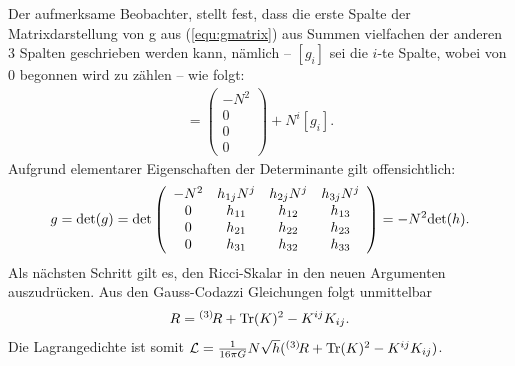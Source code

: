 \documentclass{scrartcl}
\newcommand{\inHS}{{}^{(3)}\!}
\begin{document}
		Der aufmerksame Beobachter, stellt fest, dass die erste Spalte der Matrixdarstellung von g aus (\ref{equ:gmatrix}) aus 
		Summen vielfachen der anderen 3 Spalten geschrieben werden kann, nämlich -- $[g_i]$ sei die $i$-te Spalte, wobei von
		0 begonnen wird zu zählen -- wie folgt:
		\begin{align}
			[g_0]=\left(\begin{array}{c}-N^2\\0\\0\\0\end{array}\right)+N^i[g_i].
		\end{align}
		Aufgrund elementarer Eigenschaften der Determinante gilt offensichtlich:
		\begin{align}
			g={\rm det}(g)={\rm det}\left(
			\begin{array}{cccc}
				-N^2 & h_{1j}N^j & h_{2j}N^j & h_{3j}N^j \\
				0 & h_{11} & h_{12} & h_{13}\\
				0 & h_{21} & h_{22} & h_{23}\\
				0 & h_{31} & h_{32} & h_{33}
			\end{array}\right)=-N^2 {\rm det}(h).
		\end{align}
		Als nächsten Schritt gilt es, den Ricci-Skalar in den neuen Argumenten auszudrücken. Aus den Gauss-Codazzi Gleichungen folgt unmittelbar
		\begin{align*}
			R=\inHS R+{\rm Tr}(K)^2-K^{ij}K_{ij}.
		\end{align*}
		Die Lagrangedichte ist somit $\mathcal{L}=\frac{1}{16\pi G} N\sqrt{h}(\inHS R+{\rm Tr}(K)^2-K^{ij}K_{ij})$. 
		
\end{document}
